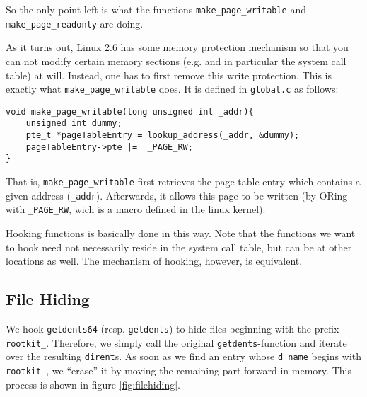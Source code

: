 \documentclass[10pt, letterpaper]{article}
\newcommand{\todo}[1]{}%
\begin{document}
So the only point left is what the functions \texttt{make\_page\_writable} and \texttt{make\_page\_readonly} are doing.

As it turns out, Linux 2.6 has some memory protection mechanism so that you can not modify certain memory sections (e.g. and in particular the system call table) at will. Instead, one has to first remove this write protection. This is exactly what \texttt{make\_page\_writable} does. It is defined in \texttt{global.c} as follows:

\begin{verbatim}
void make_page_writable(long unsigned int _addr){
    unsigned int dummy;
    pte_t *pageTableEntry = lookup_address(_addr, &dummy);
    pageTableEntry->pte |=  _PAGE_RW;
}
\end{verbatim}

That is, \texttt{make\_page\_writable} first retrieves the page table entry which contains a given address (\texttt{\_addr}). Afterwards, it allows this page to be written (by ORing with \texttt{\_PAGE\_RW}, wich is a macro defined in the linux kernel). \todo{Is this correct, what I'm writing here?}

Hooking functions is basically done in this way. Note that the functions we want to hook need not necessarily reside in the system call table, but can be at other locations as well. The mechanism of hooking, however, is equivalent.

\subsection{File Hiding}
\label{filehiding}
We hook \texttt{getdents64} (resp. \texttt{getdents}) to hide files beginning with the prefix \texttt{rootkit\_}. 
Therefore, we simply call the original \texttt{getdents}-function and iterate over the resulting
\texttt{dirent}s. As soon as we find an entry whose \texttt{d\_name} begins with \texttt{rootkit\_},
we ``erase'' it by moving the remaining part forward in memory. This process is shown in figure \ref{fig:filehiding}.
\end{document}
